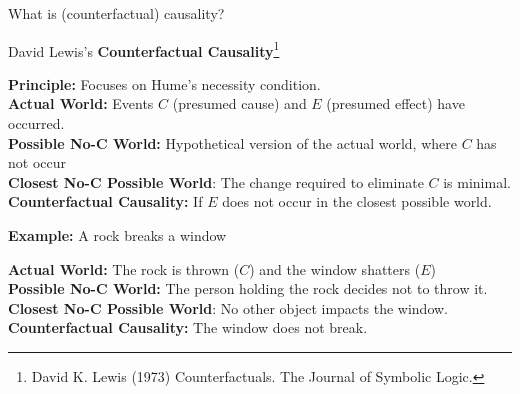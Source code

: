 \documentclass[aspectratio=169]{beamer}
\begin{document}
\begin{frame}{What is (counterfactual) causality?}
\vspace{-0.4cm}

\begin{center}
    David Lewis's \textbf{Counterfactual Causality}\footnote{\scriptsize David K. Lewis (1973) Counterfactuals. The Journal of Symbolic Logic. %
    }
\end{center}

\textbf{Principle:} Focuses on Hume's necessity condition. \\
\textbf{Actual World:} %
Events $C$ (presumed cause) and \(E\) (presumed effect) have occurred. \\
\textbf{Possible No-$\pmb{C}$ World:} Hypothetical %
version of the actual world, where $C$ has not occur %
\\
\textbf{Closest No-$\pmb{C}$ Possible World}: The change required to eliminate $C$ is minimal. %
\\
\textbf{Counterfactual Causality:} If $E$ does not occur in the closest possible world.
\vspace{0.4cm}

\begin{center}
    \textbf{Example:} A rock breaks a window
\end{center}

\textbf{Actual World:} %
The rock is thrown ($C$) and the window shatters ($E$)\\
\textbf{Possible No-$\pmb{C}$ World:} The person holding the rock decides not to throw it. \\
\textbf{Closest No-$\pmb{C}$ Possible World}: No other object impacts the window. \\
\textbf{Counterfactual Causality:} The window does not break.

\end{frame}
\end{document}
